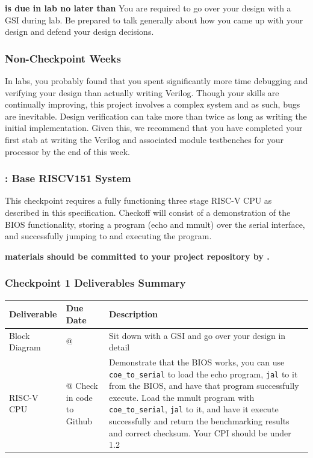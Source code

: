 \documentclass[11pt]{article}
\begin{document}
\textbf{\blockDiagramTaskName \space is due in lab no later than \dueDateTime \space \blockDiagramDueDate} You are required to go over your design with a GSI during lab. Be prepared to talk generally about how you came up with your design and defend your design decisions.

\subsubsection{Non-Checkpoint Weeks}

In labs, you probably found that you spent significantly more time debugging and verifying your design than actually writing Verilog. Though your skills are continually improving, this project involves a complex system and as such, bugs are inevitable. Design verification can take more than twice as long as writing the initial implementation. Given this, we recommend that you have completed your first stab at writing the Verilog and associated module testbenches for your processor by the end of this week.

\subsubsection{\baseCPUTaskName: Base RISCV151 System}
This checkpoint requires a fully functioning three stage RISC-V CPU as described in this specification. Checkoff will consist of a demonstration of the BIOS functionality, storing a program (echo and mmult) over the serial interface, and successfully jumping to and executing the program. 

\textbf{\baseCPUTaskName \space materials should be committed to your project repository by \dueDateTime \space \baseCPUDueDate.}

\subsubsection{Checkpoint 1 Deliverables Summary}
\begin{center}
	\begin{tabular}{m{30mm} m{35mm} m{70mm}}
		\toprule
		\textbf{Deliverable} & \textbf{Due Date} & \textbf{Description} \\
		\midrule
		Block Diagram & \blockDiagramDueDate \space @ \dueDateTime & Sit down with a GSI and go over your design in detail\\
		\midrule
		RISC-V CPU & \baseCPUDueDate \space @ \dueDateTime \linebreak Check in code to Github & Demonstrate that the BIOS works, you can use \verb|coe_to_serial| to load the echo program, \verb|jal| to it from the BIOS, and have that program successfully execute. Load the mmult program with \verb|coe_to_serial|, \verb|jal| to it, and have it execute successfully and return the benchmarking results and correct checksum. Your CPI should be under 1.2\\
		\bottomrule
	\end{tabular}
\end{center}
\end{document}
